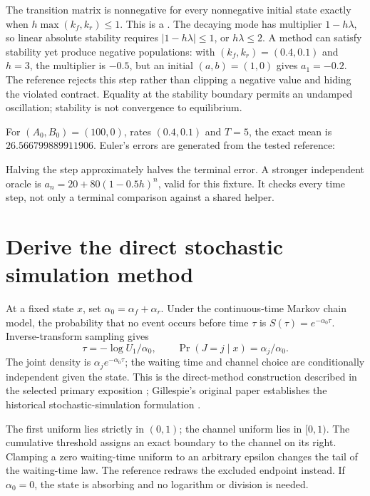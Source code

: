 The transition matrix is nonnegative for every nonnegative initial state exactly
when $h\max(k_f,k_r)\le1$. This is a . The decaying
mode has multiplier $1-h\lambda$, so linear absolute stability requires
$|1-h\lambda|\le1$, or $h\lambda\le2$. A method can satisfy stability yet
produce negative populations: with $(k_f,k_r)=(0.4,0.1)$ and $h=3$,
the multiplier is $-0.5$, but an initial $(a,b)=(1,0)$ gives $a_1=-0.2$.
The reference rejects this step rather than clipping a negative value and hiding
the violated contract. Equality at the stability boundary permits an undamped
oscillation; stability is not convergence to equilibrium.

For $(A_0,B_0)=(100,0)$, rates $(0.4,0.1)$ and $T=5$, the exact mean is
$26.566799889911906$. Euler's errors are generated from the tested reference:
\begin{center}\end{center}
Halving the step approximately halves the terminal error. A stronger independent
oracle is $a_n=20+80(1-0.5h)^n$, valid for this fixture. It checks every time
step, not only a terminal comparison against a shared helper.

\section{Derive the direct stochastic simulation method}
At a fixed state $x$, set $\alpha_0=\alpha_f+\alpha_r$. Under the continuous-time
Markov chain model, the probability that no event occurs before time $\tau$ is
$S(\tau)=e^{-\alpha_0\tau}$. Inverse-transform sampling gives
\[
\tau=-\log U_1/\alpha_0,\qquad
\Pr(J=j\mid x)=\alpha_j/\alpha_0.
\]
The joint density is $\alpha_j e^{-\alpha_0\tau}$; the waiting time and channel
choice are conditionally independent given the state. This is the direct-method
construction described in the selected primary exposition
\cite{Higham2008}; Gillespie's original paper establishes the historical
stochastic-simulation formulation \cite{Gillespie1977}.

The first uniform lies strictly in $(0,1)$; the channel uniform lies in $[0,1)$.
The cumulative threshold assigns an exact boundary to the channel on its right.
Clamping a zero waiting-time uniform to an arbitrary epsilon changes the tail of
the waiting-time law. The reference redraws the excluded endpoint instead.
If $\alpha_0=0$, the state is absorbing and no logarithm or division is needed.

